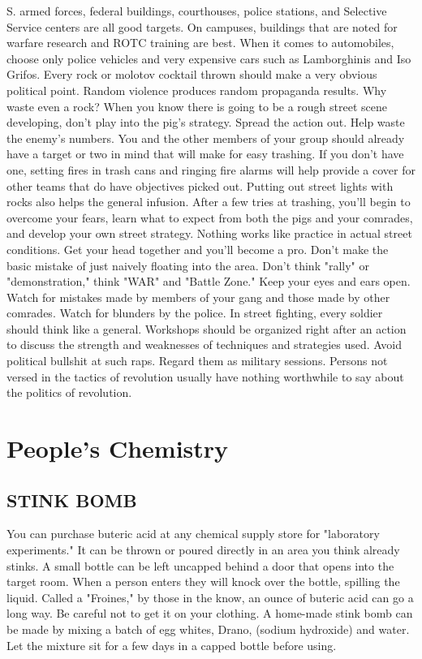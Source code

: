 \documentclass[11pt,twoside,a4paper]{book}
\begin{document}
S. armed forces, federal buildings, courthouses, police stations, and Selective Service centers are all good targets. On campuses, buildings that are noted for warfare research and ROTC training are best. When it comes to automobiles, choose only police vehicles and very expensive cars such as Lamborghinis and Iso Grifos. Every rock or molotov cocktail thrown should make a very obvious political point. Random violence produces random propaganda results. Why waste even a rock? When you know there is going to be a rough street scene developing, don't play into the pig's strategy. Spread the action out. Help waste the enemy's numbers. You and the other members of your group should already have a target or two in mind that will make for easy trashing. If you don't have one, setting fires in trash cans and ringing fire alarms will help provide a cover for other teams that do have objectives picked out. Putting out street lights with rocks also helps the general infusion. After a few tries at trashing, you'll begin to overcome your fears, learn what to expect from both the pigs and your comrades, and develop your own street strategy. Nothing works like practice in actual street conditions. Get your head together and you'll become a pro. Don't make the basic mistake of just naively floating into the area. Don't think "rally" or "demonstration," think "WAR" and "Battle Zone." Keep your eyes and ears open. Watch for mistakes made by members of your gang and those made by other comrades. Watch for blunders by the police. In street fighting, every soldier should think like a general. Workshops should be organized right after an action to discuss the strength and weaknesses of techniques and strategies used. Avoid political bullshit at such raps. Regard them as military sessions. Persons not versed in the tactics of revolution usually have nothing worthwhile to say about the politics of revolution.

\section{People's Chemistry}
\subsection{STINK BOMB}

	You can purchase buteric acid at any chemical supply store for "laboratory experiments." It can be thrown or poured directly in an area you think already stinks. A small bottle can be left uncapped behind a door that opens into the target room.	When a person enters they will knock over the bottle, spilling the liquid. Called a "Froines," by those in the know, an ounce of buteric acid can go a long way. Be careful not to get it on your clothing. A home-made stink bomb can be made by mixing a batch of egg whites, Drano, (sodium hydroxide) and water. Let the mixture sit for a few days in a capped bottle before using.
\end{document}
